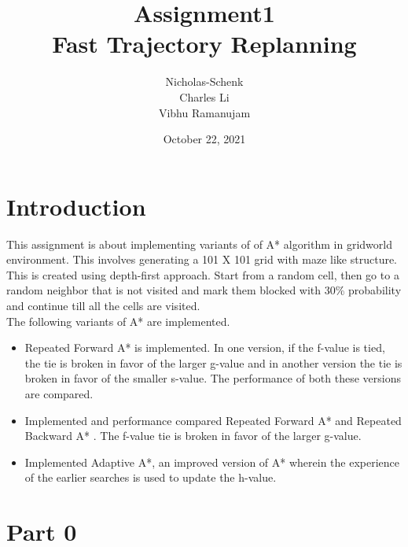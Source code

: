 \documentclass[12pt]{article}
\title{Assignment1 \\
Fast Trajectory Replanning}
\author{Nicholas-Schenk\\
Charles Li\\
Vibhu Ramanujam}
\date{October 22, 2021}
\begin{document}
\maketitle


\newpage



\section*{Introduction}
This assignment is about implementing variants of of A* algorithm in gridworld environment. This involves generating a 101 X 101 grid with maze like structure. This is created using depth-first approach. Start from a random cell, then go to a random neighbor that is not visited and mark them blocked with 30\% probability and continue till all the cells are visited.
\\
The following variants of A* are implemented.
  \begin{itemize}
    \item 
      \begin{flushleft}
        Repeated Forward A* is implemented. In one version, if the f-value is tied, the tie is broken in favor of the larger g-value and in another version the tie is broken in favor of the smaller s-value. The performance of both these versions are compared.
        \end{flushleft}
    \item
		\begin{flushleft}
        Implemented and performance compared Repeated Forward A* and Repeated Backward A* . The f-value tie is broken in favor of the larger g-value.
         \end{flushleft}
     \item
		\begin{flushleft}
        Implemented Adaptive A*, an improved version of A* wherein the experience of the earlier searches is used to update the h-value.
        \end{flushleft}
      
 \end{itemize}
      
\section*{Part 0}
\end{document}
